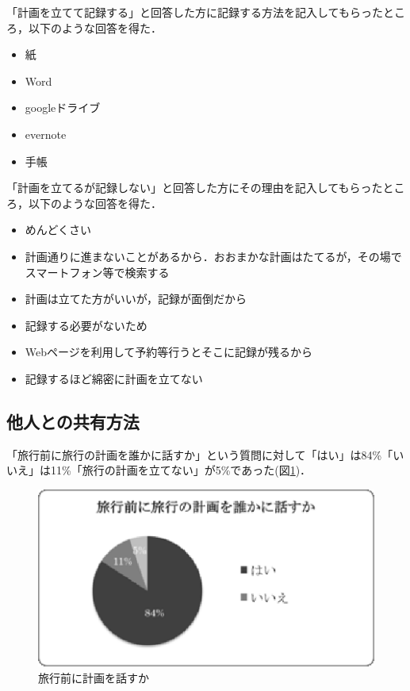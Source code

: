 \documentclass{funthesis}
\begin{document}
「計画を立てて記録する」と回答した方に記録する方法を記入してもらったところ，以下のような回答を得た．
\begin{itemize}
 \item 紙
 \item Word
 \item googleドライブ
 \item evernote
 \item 手帳
\end{itemize}


「計画を立てるが記録しない」と回答した方にその理由を記入してもらったところ，以下のような回答を得た．
\begin{itemize}
 \item めんどくさい
 \item 計画通りに進まないことがあるから．おおまかな計画はたてるが，その場でスマートフォン等で検索する
 \item 計画は立てた方がいいが，記録が面倒だから
 \item 記録する必要がないため
 \item Webページを利用して予約等行うとそこに記録が残るから
 \item 記録するほど綿密に計画を立てない
\end{itemize}


\subsection{他人との共有方法}

「旅行前に旅行の計画を誰かに話すか」という質問に対して「はい」は84\%「いいえ」は11\%「旅行の計画を立てない」が5\%であった(図\ref{Lbeforetalktrip})．\\
\begin{figure}[htpb]
\begin{center}
\includegraphics[scale=0.65]{beforetalktrip.eps}
\end{center}
\caption{旅行前に計画を話すか}
\label{Lbeforetalktrip}
\end{figure}
\end{document}
